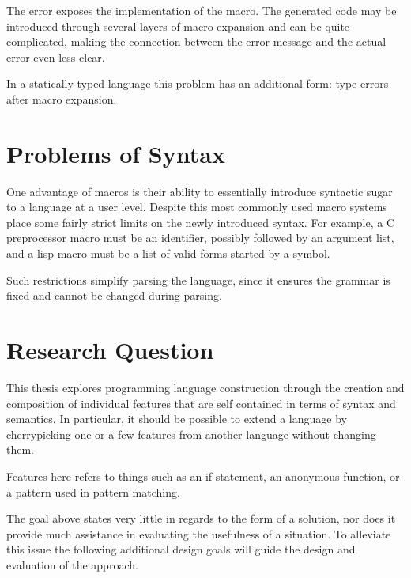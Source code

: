 \documentclass{kththesis}
\begin{document}
The error exposes the implementation of the macro. The generated code may be introduced through several layers of macro expansion and can be quite complicated, making the connection between the error message and the actual error even less clear.

In a statically typed language this problem has an additional form: type errors after macro expansion.

\section{Problems of Syntax} \label{sec:problem-syntax}

One advantage of macros is their ability to essentially introduce syntactic sugar to a language at a user level. Despite this most commonly used macro systems place some fairly strict limits on the newly introduced syntax. For example, a C preprocessor macro must be an identifier, possibly followed by an argument list, and a lisp macro must be a list of valid forms started by a symbol.

Such restrictions simplify parsing the language, since it ensures the grammar is fixed and cannot be changed during parsing.

\section{Research Question} \label{sec:research-question}

This thesis explores programming language construction through the creation and composition of individual features that are self contained in terms of syntax and semantics. In particular, it should be possible to extend a language by cherrypicking one or a few features from another language without changing them.

Features here refers to things such as an if-statement, an anonymous function, or a pattern used in pattern matching.

The goal above states very little in regards to the form of a solution, nor does it provide much assistance in evaluating the usefulness of a situation. To alleviate this issue the following additional design goals will guide the design and evaluation of the approach.
\end{document}
